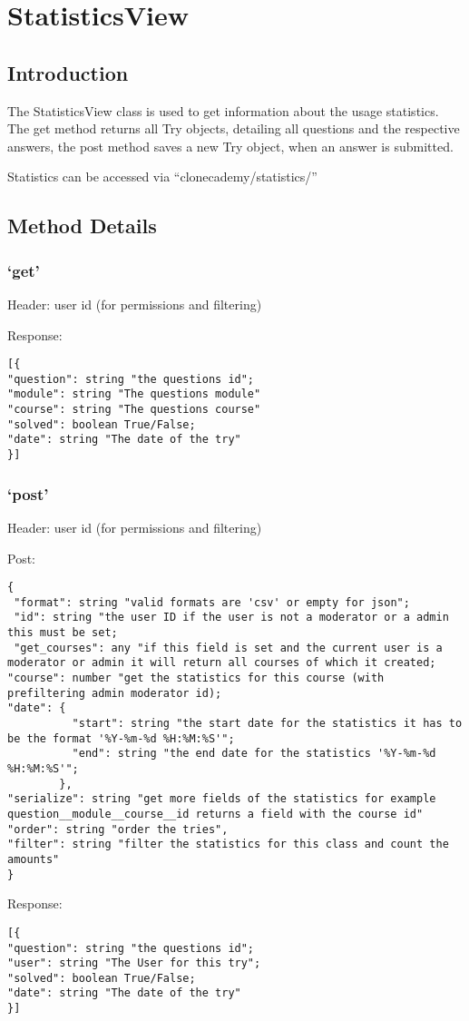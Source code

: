\chapter*{StatisticsView}

\section*{Introduction}\label{introduction}

The StatisticsView class is used to get information about the usage
statistics. The get method returns all Try objects, detailing all
questions and the respective answers, the post method saves a new Try
object, when an answer is submitted.

Statistics can be accessed via ``clonecademy/statistics/''

\section*{Method Details}\label{method-details}

\subsection*{\texorpdfstring{`get'}{get}}\label{get}

Header: user id (for permissions and filtering)

Response:

\begin{verbatim}
[{
"question": string "the questions id";
"module": string "The questions module"
"course": string "The questions course"
"solved": boolean True/False;
"date": string "The date of the try"
}]
\end{verbatim}

\subsection*{\texorpdfstring{`post'}{post}}\label{post}

Header: user id (for permissions and filtering)

Post:

\begin{verbatim}
{ 
 "format": string "valid formats are 'csv' or empty for json";
 "id": string "the user ID if the user is not a moderator or a admin this must be set;
 "get_courses": any "if this field is set and the current user is a moderator or admin it will return all courses of which it created;
"course": number "get the statistics for this course (with prefiltering admin moderator id);
"date": {
          "start": string "the start date for the statistics it has to be the format '%Y-%m-%d %H:%M:%S'";
          "end": string "the end date for the statistics '%Y-%m-%d %H:%M:%S'";
        },
"serialize": string "get more fields of the statistics for example question__module__course__id returns a field with the course id"
"order": string "order the tries",
"filter": string "filter the statistics for this class and count the amounts"
}
\end{verbatim}

Response:

\begin{verbatim}
[{
"question": string "the questions id";
"user": string "The User for this try";
"solved": boolean True/False;
"date": string "The date of the try"
}]
\end{verbatim}


